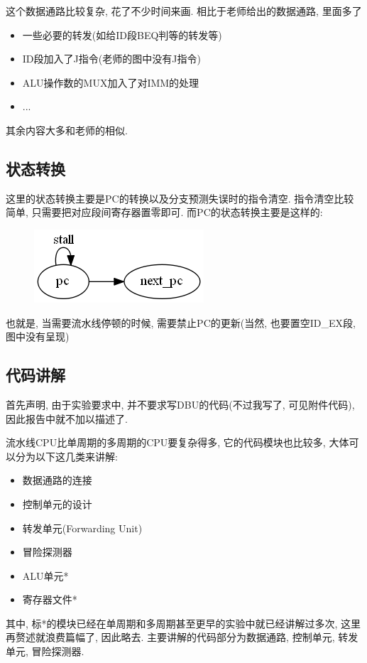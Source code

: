 \documentclass[UTF8]{article}
\begin{document}
这个数据通路比较复杂, 花了不少时间来画. 相比于老师给出的数据通路, 里面多了
\begin{itemize}
	\item 一些必要的转发(如给ID段BEQ判等的转发等)
	\item ID段加入了J指令(老师的图中没有J指令)
	\item ALU操作数的MUX加入了对IMM的处理
	\item ...
\end{itemize}
其余内容大多和老师的相似.
\subsection{状态转换}
这里的状态转换主要是PC的转换以及分支预测失误时的指令清空. 指令清空比较简单, 只需要把对应段间寄存器置零即可. 而PC的状态转换主要是这样的:
\begin{figure}[H]
	\centering
	\includegraphics[width=\linewidth/3]{phase_diagram.png}
\end{figure}
也就是, 当需要流水线停顿的时候, 需要禁止PC的更新(当然, 也要置空ID\_EX段, 图中没有呈现)
\subsection{代码讲解}
首先声明, 由于实验要求中, 并不要求写DBU的代码(不过我写了, 可见附件代码), 因此报告中就不加以描述了.\par
流水线CPU比单周期的多周期的CPU要复杂得多, 它的代码模块也比较多, 大体可以分为以下这几类来讲解:
\begin{itemize}
	\item 数据通路的连接
	\item 控制单元的设计
	\item 转发单元(Forwarding Unit)
	\item 冒险探测器
	\item ALU单元*
	\item 寄存器文件*
\end{itemize}
其中, 标*的模块已经在单周期和多周期甚至更早的实验中就已经讲解过多次, 这里再赘述就浪费篇幅了, 因此略去. 主要讲解的代码部分为数据通路, 控制单元, 转发单元, 冒险探测器.
\end{document}

